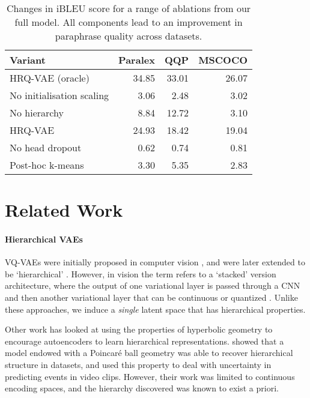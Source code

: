 \documentclass[11pt]{article}
\begin{document}
\begin{table}[t!]
    \centering
\small
\begin{tabular}{l@{~}|r@{~}|r@{~}|r@{}}
\textbf{Variant} & {\textbf{Paralex}} & {\textbf{QQP}} & {\textbf{MSCOCO}} \\
\hline \hline
    HRQ-VAE (oracle) & 34.85 & 33.01 & 26.07  \\
    \hline
    No initialisation scaling & 3.06 & 2.48 & 3.02 \\
No hierarchy & 8.84 & 12.72 & 3.10 \\
\hline \hline
    HRQ-VAE & 24.93 & 18.42 & 19.04  \\
    \hline 
    No head dropout & 0.62 & 0.74 & 0.81 \\


    Post-hoc k-means & 3.30 & 5.35 & 2.83 \\
    \hline \hline
    \end{tabular}
\caption{Changes in iBLEU score for a range of ablations from our
      full model. All components lead to an improvement in paraphrase
      quality across datasets.} 
\label{tab:ablations}
\end{table}




\section{Related Work}



\paragraph{Hierarchical VAEs}

VQ-VAEs were initially proposed in computer vision \cite{vqvae}, and were later extended to be `hierarchical' \cite{vqvae2}. However, in vision the term refers to a `stacked' version architecture, where the output of one variational layer is passed through a CNN and then another variational layer that can be continuous \cite{vahdat2020NVAE} or quantized \cite{hqa,Livin2019TowardsHD,willetts2021relaxedresponsibility}. Unlike these approaches, we induce a \emph{single} latent space that has hierarchical properties. 

Other work has looked at using the properties of hyperbolic geometry to encourage autoencoders to learn hierarchical representations. \citet{mathieu2019poincare} showed that a model endowed with a Poincaré ball geometry was able to recover hierarchical structure in datasets, and \citet{suris2021hyperfuture} used this property to deal with uncertainty in predicting events in video clips. However, their work was limited to continuous encoding spaces, and the hierarchy discovered was known to exist a priori. 
\end{document}
